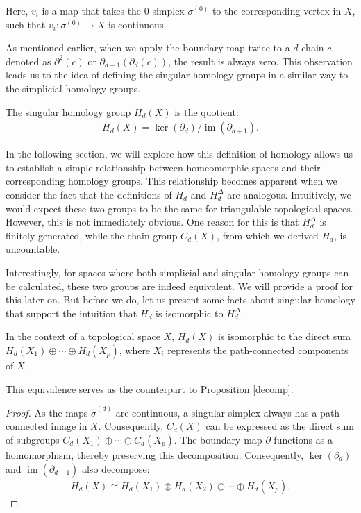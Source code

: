 Here, \( v_{i} \) is a map that takes the \( 0 \)-simplex \( \sigma^{(0)} \) to the corresponding vertex in \( X \), such that \( v_{i}: \sigma^{(0)} \to X \) is continuous.

As mentioned earlier, when we apply the boundary map twice to a \( d \)-chain \( c \), denoted as \( \partial^{2}(c) \) or \( \partial_{d-1}(\partial_{d}(c)) \), the result is always zero. This observation leads us to the idea of defining the singular homology groups in a similar way to the simplicial homology groups.

\begin{definition}
The singular homology group \( H_{d}(X) \) is the quotient:
\begin{align}
H_{d}(X) = \ker(\partial_{d}) / \operatorname{im}(\partial_{d+1}).
\end{align}
\end{definition}

In the following section, we will explore how this definition of homology allows us to establish a simple relationship between homeomorphic spaces and their corresponding homology groups. This relationship becomes apparent when we consider the fact that the definitions of \( H_{d} \) and \( H^{\Delta}_{d} \) are analogous. Intuitively, we would expect these two groups to be the same for triangulable topological spaces. However, this is not immediately obvious. One reason for this is that \( H^{\Delta}_{d} \) is finitely generated, while the chain group \( C_{d}(X) \), from which we derived \( H_{d} \), is uncountable.

Interestingly, for spaces where both simplicial and singular homology groups can be calculated, these two groups are indeed equivalent. We will provide a proof for this later on. But before we do, let us present some facts about singular homology that support the intuition that \( H_{d} \) is isomorphic to \( H^{\Delta}_{d} \).

\begin{proposition}{\cite[p.108f]{hatcher2005algebraic}}
In the context of a topological space \( X \), \( H_{d}(X) \) is isomorphic to the direct sum \( H_{d}(X_{1}) \oplus \cdots \oplus H_{d}(X_{p}) \), where \( X_{i} \) represents the path-connected components of \( X \).
\end{proposition}

This equivalence serves as the counterpart to Proposition \ref{decomp}.

\begin{proof}
As the maps \( \tilde{\sigma}^{(d)} \) are continuous, a singular simplex always has a path-connected image in \( X \). Consequently, \( C_{d}(X) \) can be expressed as the direct sum of subgroups \( C_{d}(X_{1}) \oplus \cdots \oplus C_{d}(X_{p}) \). The boundary map \( \partial \) functions as a homomorphism, thereby preserving this decomposition. Consequently, \( \ker(\partial_{d}) \) and \( \operatorname{im}(\partial_{d+1}) \) also decompose:
\begin{align}
H_{d}(X) \cong H_{d}(X_{1}) \oplus H_{d}(X_{2}) \oplus \cdots \oplus H_{d}(X_{p}).
\end{align}
\end{proof}

